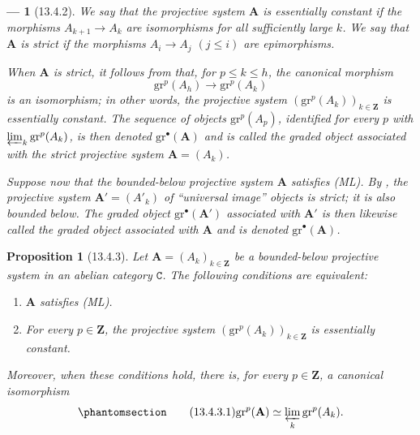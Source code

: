 \documentclass[oneside]{amsart}
\theoremstyle{ega-env-style}
\newtheorem*{env}{---}
\theoremstyle{ega-thm-env-style}
\newtheorem*{proposition}{Proposition}
\theoremstyle{ega-defn-env-style}
\def\bb{\mathbf}                    %
\def\cat{\mathtt}                   %
\def\leq{\leqslant}                 %
\def\isoto{\simeq} %
\let\EGAOriginalLabel\label
\renewcommand{\label}[1]{\phantomsection\EGAOriginalLabel{#1}}
\begin{document}
\begin{env}[13.4.2]
\label{0.13.4.2}
We say that the projective system $\bb{A}$ is
\emph{essentially constant} if the morphisms
$A_{k+1}\longrightarrow A_k$ are isomorphisms for all sufficiently
large $k$.
We say that $\bb{A}$ is \emph{strict} if the morphisms
$A_i\longrightarrow A_j$ $(j\leq i)$ are epimorphisms.

When $\bb{A}$ is strict, it follows from  that, for
$p\leq k\leq h$, the canonical morphism
\[
  \mathrm{gr}^p(A_h)\longrightarrow\mathrm{gr}^p(A_k)
\]
is an isomorphism; in other words, the projective system
$(\mathrm{gr}^p(A_k))_{k\in\bb{Z}}$ is essentially constant.
The sequence of objects $\mathrm{gr}^p(A_p)$, identified for every
$p$ with $\varprojlim_k\mathrm{gr}^p(A_k)$, is then denoted
$\mathrm{gr}^\bullet(\bb{A})$ and is called the
\emph{graded object associated with the strict projective system}
$\bb{A}=(A_k)$.

Suppose now that the bounded-below projective system $\bb{A}$
satisfies (ML).
By , the projective system
$\bb{A}'=(A'_k)$ of ``universal image'' objects is strict; it is also
bounded below.
The graded object $\mathrm{gr}^\bullet(\bb{A}')$ associated with
$\bb{A}'$ is then likewise called the graded object
\emph{associated with} $\bb{A}$ and is denoted
$\mathrm{gr}^\bullet(\bb{A})$.
\end{env}

\begin{proposition}[13.4.3]
\label{0.13.4.3}
Let $\bb{A}=(A_k)_{k\in\bb{Z}}$ be a bounded-below projective system
in an abelian category $\cat{C}$.
The following conditions are equivalent:
\begin{enumerate}
  \item[{\rm a)}] $\bb{A}$ satisfies (ML).
  \item[{\rm b)}] For every $p\in\bb{Z}$, the projective system
  $(\mathrm{gr}^p(A_k))_{k\in\bb{Z}}$ is essentially constant.
\end{enumerate}
Moreover, when these conditions hold, there is, for every
$p\in\bb{Z}$, a canonical isomorphism
\begin{equation}
\label{0.13.4.3.1}
\tag{13.4.3.1}
  \mathrm{gr}^p(\bb{A})
  \isoto
  \varprojlim_k\mathrm{gr}^p(A_k).
\end{equation}
\end{proposition}
\end{document}
